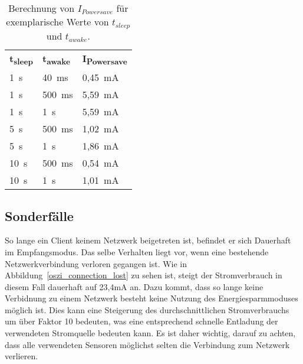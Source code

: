 \begin{table}
    \begin{center}
        \begin{tabular}{lll}
            \textbf{t\textsubscript{sleep}} & \textbf{t\textsubscript{awake}} & \textbf{I\textsubscript{Powersave}} \\
            1~s  & 40~ms  & 0,45~mA \\
            1~s  & 500~ms & 5,59~mA \\
            1~s  & 1~s    & 5,59~mA \\
            5~s  & 500~ms & 1,02~mA \\
            5~s  & 1~s    & 1,86~mA \\
            10~s & 500~ms & 0,54~mA \\
            10~s & 1~s    & 1,01~mA 
        \end{tabular}
    \end{center}
    \caption{Berechnung von $I_{Powersave}$ für exemplarische Werte von $t_{sleep}$ und $t_{awake}$.}
    \label{werte_Ipowersave}
\end{table}

\subsection{Sonderfälle}

So lange ein Client keinem Netzwerk beigetreten ist, befindet er sich Dauerhaft im Empfangsmodus. Das selbe Verhalten liegt
vor, wenn eine bestehende Netzwerkverbindung verloren gegangen ist. Wie in Abbildung~\ref{oszi_connection_lost} zu sehen
ist, steigt der Stromverbrauch in diesem Fall dauerhaft auf 23,4mA an. Dazu kommt, dass so lange keine Verbidnung zu
einem Netzwerk besteht keine Nutzung des Energiesparmmoduses möglich ist. Dies kann eine Steigerung des durchschnittlichen
Stromverbrauchs um über Faktor 10 bedeuten, was eine entsprechend schnelle Entladung der verwendeten Stromquelle bedeuten
kann. Es ist daher wichtig, darauf zu achten, dass alle verwendeten Sensoren möglichst selten die Verbindung zum 
Netzwerk verlieren.


